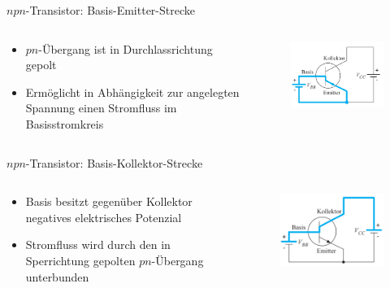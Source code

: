 \documentclass[12pt%
,aspectratio=169%
]{beamer}
\begin{document}
\begin{frame}{$npn$-Transistor: Basis-Emitter-Strecke}
\begin{columns}[T] %
\begin{column}{.48\textwidth}
	\begin{itemize}
		\item $pn$-Übergang ist in Durchlassrichtung gepolt
		\item Ermöglicht in Abhängigkeit zur angelegten Spannung einen Stromfluss im Basisstromkreis
	\end{itemize}
\end{column}%
\hfill%
\begin{column}{.48\textwidth}
\begin{figure}
\center
\includegraphics[scale=0.6]{pictures/be}
\end{figure}
\end{column}%
\end{columns}
\end{frame}

\begin{frame}{$npn$-Transistor: Basis-Kollektor-Strecke}
\begin{columns}[T] %
\begin{column}{.48\textwidth}
	\begin{itemize}
		\item Basis besitzt gegenüber Kollektor negatives elektrisches Potenzial
		\item Stromfluss wird durch den in Sperrichtung gepolten $pn$-Übergang unterbunden
	\end{itemize}
\end{column}%
\hfill%
\begin{column}{.48\textwidth}
\begin{figure}
\center
\includegraphics[scale=0.6]{pictures/bk}
\end{figure}
\end{column}%
\end{columns}
\end{frame}
\end{document}
